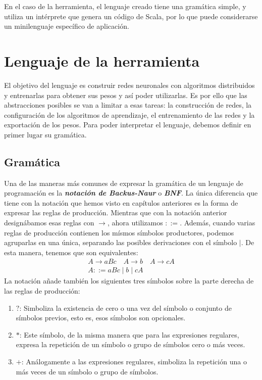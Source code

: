 \vspace{10pt}
En el caso de la herramienta, el lenguaje creado tiene una gramática simple, y utiliza un intérprete que genera un
código de Scala, por lo que puede considerarse un minilenguaje específico de aplicación.

\section{Lenguaje de la herramienta}

El objetivo del lenguaje es construir redes neuronales con algoritmos distribuidos y entrenarlas para obtener sus
pesos y así poder utilizarlas. Es por ello que las abstracciones posibles se van a limitar a esas tareas: la 
construcción de redes, la configuración de los algoritmos de aprendizaje, el entrenamiento de las redes y la 
exportación de los pesos. Para poder interpretar el lenguaje, debemos definir en primer lugar su gramática.

\subsection{Gramática}

Una de las maneras más comunes de expresar la gramática de un lenguaje de programación es la \textbf{\textit{notación 
de Backus-Naur}} o \textbf{\textit{BNF}}. La única diferencia que tiene con la notación que hemos visto en capítulos
anteriores es la forma de expresar las reglas de producción. Mientras que con la notación anterior designábamos esas
reglas con $\to$, ahora utilizamos $::=$. Además, cuando varias reglas de producción contienen los mísmos símbolos 
productores, podemos agruparlas en una única, separando las posibles derivaciones con el símbolo $\mid$. De esta 
manera, tenemos que son equivalentes:
    \begin{gather}
        A\to aBc \quad A\to b \quad A\to cA \\
        A::= aBc\mid b \mid cA
    \end{gather}
La notación añade también los siguientes tres símbolos sobre la parte derecha de las reglas de producción:
\begin{enumerate}
    \item $?$: Simboliza la existencia de cero o una vez del símbolo o conjunto de símbolos previos, esto es, esos 
    símbolos son opcionales.
    \item $*$: Este símbolo, de la misma manera que para las expresiones regulares, expresa la repetición de un símbolo
    o grupo de símbolos cero o más veces.
    \item $+$: Análogamente a las expresiones regulares, simboliza la repetición una o más veces de un símbolo o grupo
    de símbolos.
\end{enumerate}

